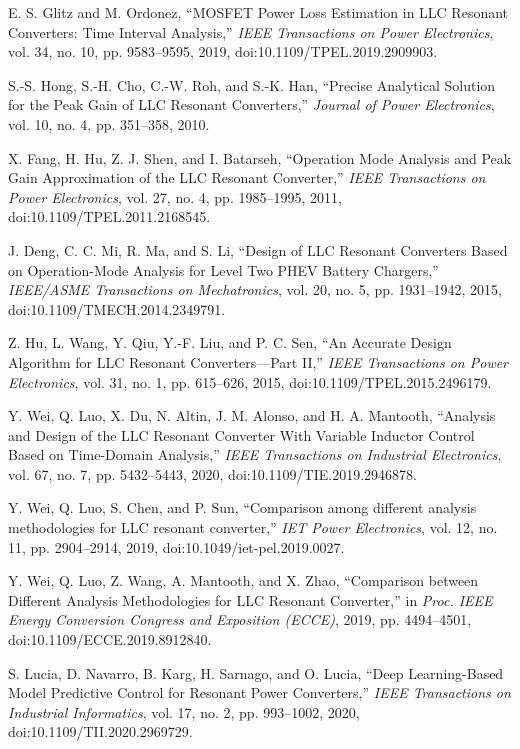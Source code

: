 \documentclass{article} %
\begin{document}
\begin{thebibliography}{99}
E. S. Glitz and M. Ordonez,
``MOSFET Power Loss Estimation in LLC Resonant Converters: Time Interval Analysis,''
\emph{IEEE Transactions on Power Electronics},
vol. 34, no. 10, pp. 9583--9595, 2019,
doi:10.1109/TPEL.2019.2909903.

S.-S. Hong, S.-H. Cho, C.-W. Roh, and S.-K. Han,
``Precise Analytical Solution for the Peak Gain of LLC Resonant Converters,''
\emph{Journal of Power Electronics},
vol. 10, no. 4, pp. 351--358, 2010.

X. Fang, H. Hu, Z. J. Shen, and I. Batarseh,
``Operation Mode Analysis and Peak Gain Approximation of the LLC Resonant Converter,''
\emph{IEEE Transactions on Power Electronics},
vol. 27, no. 4, pp. 1985--1995, 2011,
doi:10.1109/TPEL.2011.2168545.

J. Deng, C. C. Mi, R. Ma, and S. Li,
``Design of LLC Resonant Converters Based on Operation-Mode Analysis for Level Two PHEV Battery Chargers,''
\emph{IEEE/ASME Transactions on Mechatronics},
vol. 20, no. 5, pp. 1931--1942, 2015,
doi:10.1109/TMECH.2014.2349791.

Z. Hu, L. Wang, Y. Qiu, Y.-F. Liu, and P. C. Sen,
``An Accurate Design Algorithm for LLC Resonant Converters—Part II,''
\emph{IEEE Transactions on Power Electronics},
vol. 31, no. 1, pp. 615--626, 2015,
doi:10.1109/TPEL.2015.2496179.

Y. Wei, Q. Luo, X. Du, N. Altin, J. M. Alonso, and H. A. Mantooth,
``Analysis and Design of the LLC Resonant Converter With Variable Inductor Control Based on Time-Domain Analysis,''
\emph{IEEE Transactions on Industrial Electronics},
vol. 67, no. 7, pp. 5432--5443, 2020,
doi:10.1109/TIE.2019.2946878.

Y. Wei, Q. Luo, S. Chen, and P. Sun,
``Comparison among different analysis methodologies for LLC resonant converter,''
\emph{IET Power Electronics},
vol. 12, no. 11, pp. 2904--2914, 2019,
doi:10.1049/iet-pel.2019.0027.

Y. Wei, Q. Luo, Z. Wang, A. Mantooth, and X. Zhao,
``Comparison between Different Analysis Methodologies for LLC Resonant Converter,''
in \emph{Proc. IEEE Energy Conversion Congress and Exposition (ECCE)},
2019, pp. 4494--4501,
doi:10.1109/ECCE.2019.8912840.

S. Lucia, D. Navarro, B. Karg, H. Sarnago, and O. Lucia,
``Deep Learning-Based Model Predictive Control for Resonant Power Converters,''
\emph{IEEE Transactions on Industrial Informatics},
vol. 17, no. 2, pp. 993--1002, 2020,
doi:10.1109/TII.2020.2969729.


\end{thebibliography}
\end{document}
